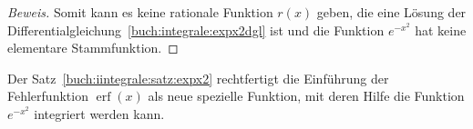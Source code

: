 \begin{proof}[Beweis]
Somit kann es keine rationale Funktion $r(x)$ geben, die eine Lösung der
Differentialgleichung~\eqref{buch:integrale:expx2dgl} ist und
die Funktion $e^{-x^2}$ hat keine elementare Stammfunktion.
\end{proof}

Der Satz~\ref{buch:iintegrale:satz:expx2} rechtfertigt die Einführung 
der Fehlerfunktion $\operatorname{erf}(x)$ als neue spezielle Funktion,
mit deren Hilfe die Funktion $e^{-x^2}$ integriert werden kann.



